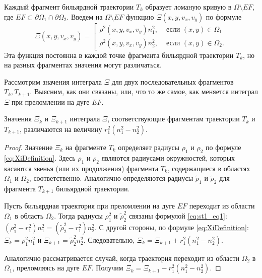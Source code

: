 
Каждый фрагмент бильярдной траектории $T_k$ образует ломаную кривую в $\Omega \setminus EF$, где $EF  \subset \partial \Omega_1 \cap \partial \Omega_2$.
Введем на $\Omega \setminus EF$ функцию $\Xi(x, y, v_x, v_y)$ по формуле
\begin{equation}
\Xi(x, y, v_x, v_y) = \left[
\begin{array}{ll}
    \rho^2(x,y,v_x,v_y) n_1^2, &  \text{ если } (x,y) \in \Omega_1 \\
    \rho^2(x,y,v_x,v_y) n_2^2, & \text{ если } (x,y) \in \Omega_2.
\end{array}
\right.
\label{eq:XiDefinition}
\end{equation}
Эта функция постоянна в каждой точке фрагмента бильярдной траектории $T_k$, но на разных фрагментах значения могут различаться. 

Рассмотрим значения интеграла $\Xi$ для двух последовательных фрагментов $T_k, T_{k+1}$. Выясним, как они связаны, или, что то же самое, как меняется интеграл $\Xi$ при преломлении на дуге $EF$. 

\begin{statement}
Значения $\Xi_k$ и $\Xi_{k+1}$  интеграла $\Xi$, соответствующие фрагментам траектории $T_k$ и $T_{k+1}$, различаются на величину $r_1^2(n_1^2-n_2^2)$.
\end{statement}
\begin{proof}
Значение $\Xi_k$ на фрагменте $T_k$ определяет радиусы $\rho_1$ и $\rho_2$ по формуле \eqref{eq:XiDefinition}. Здесь $\rho_1$ и $\rho_2$ являются радиусами окружностей, которых касаются звенья (или их продолжения) фрагмента $T_k$, содержащиеся в областях $\Omega_1$ и $\Omega_2$, соответственно.
Аналогично определяются радиусы $\widetilde{\rho}_1$ и $\widetilde{\rho}_2$ для фрагмента $T_{k+1}$ бильярдной траектории.


Пусть бильярдная траектория при преломлении на дуге $EF$ переходит из области $\Omega_1$ в область $\Omega_2$. 
Тогда радиусы $\rho_1^2$ и $\widetilde{\rho}_2^2$ связаны формулой \eqref{eq:st1_eq1}:  $(\rho_1^2 - r_1^2)n_1^2 = (\widetilde{\rho}_2^2 - r_1^2)n_2^2$.
С другой стороны, по формуле \eqref{eq:XiDefinition}: $\Xi_k = \rho_1^2 n_1^2$ и $\Xi_{k+1} = \widetilde{\rho}_2^2 n_2^2$.
Следовательно, $\Xi_k = \Xi_{k+1}  +r_1^2 (n_1^2 - n_2^2 )$.

Аналогично рассматривается случай, когда траектория переходит из области $\Omega_2$ в $\Omega_1$, преломляясь на дуге $EF$. Получим $\Xi_k = \Xi_{k+1}  - r_1^2 (n_1^2 - n_2^2 )$.
\end{proof}



